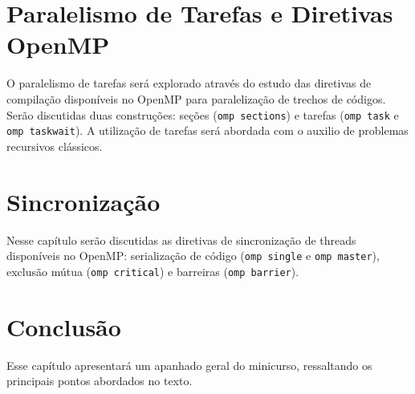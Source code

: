 \documentclass{SBCbookchapter}
\begin{document}
\section{Paralelismo de Tarefas e Diretivas OpenMP}

O paralelismo de tarefas será explorado através do estudo das diretivas de compilação disponíveis no OpenMP para paralelização de trechos de códigos. Serão discutidas duas construções: seções (\texttt{omp sections}) e tarefas (\texttt{omp task} e \texttt{omp taskwait}). A utilização de tarefas será abordada com o auxilio de problemas recursivos clássicos.

\section{Sincronização}

Nesse capítulo serão discutidas as diretivas de sincronização de threads disponíveis no OpenMP: serialização de código (\texttt{omp single} e \texttt{omp master}), exclusão mútua (\texttt{omp critical}) e barreiras (\texttt{omp barrier}).

\section{Conclusão}

Esse capítulo apresentará um apanhado geral do minicurso, ressaltando os principais pontos abordados no texto.


\end{document}
